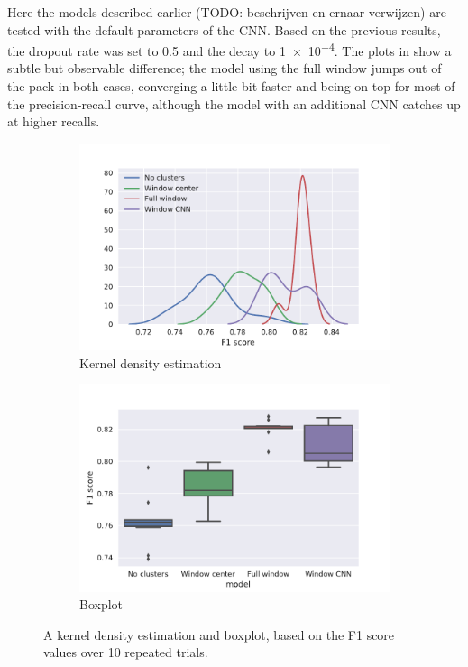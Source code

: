 Here the models described earlier (TODO: beschrijven en ernaar verwijzen) are
tested with the default parameters of the CNN\@. Based on the previous results,
the dropout rate was set to 0.5 and the decay to \num{1e-4}.
The plots in  show a subtle but observable difference; the
model using the full window jumps out of the pack in both cases, converging a
little bit faster and being on top for most of the precision-recall curve,
although the model with an additional CNN catches up at higher recalls.

\begin{figure}[htbp]
  \centering
  \begin{subfigure}[t]{0.49\textwidth}
    \centering
    \includegraphics[width=\textwidth]{./figures/results/models/kde_f1.pdf}
    \caption{Kernel density estimation}%
    \label{fig:model_kde}
  \end{subfigure}
  \begin{subfigure}[t]{0.49\textwidth}
    \centering
    \includegraphics[width=\textwidth]{./figures/results/models/boxplot_f1.pdf}
    \caption{Boxplot}%
    \label{fig:model_box}
  \end{subfigure}
  \caption{A kernel density estimation and boxplot, based on the F1 score values
  over 10 repeated trials.}%
  \label{fig:model_dists}
\end{figure}


